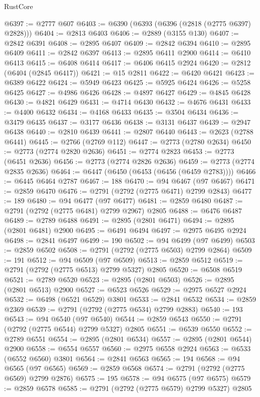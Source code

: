 \begin{lexlean}{RustCore}
\begin{coremodule}
@6397 := @2777 @607
@6403 := @6390 (@6393 (@6396 (@2818 (@2775 @6397) @2828)))
@6404 := @2813 @6403
@6406 := @2889 (@3155 @130)
@6407 := @2842 @6391
@6408 := @2895 @6407
@6409 := @2842 @6394
@6410 := @2895 @6409
@6411 := @2842 @6397
@6413 := @2895 @6411 @2900
@6414 := @6410 @6413
@6415 := @6408 @6414
@6417 := @6406 @6415 @2924
@6420 := @2812 (@6404 (@2845 @6417))
@6421 := @15 @2811
@6422 := @6420 @6421
@6423 := @6389 @6422
@6424 := @5949 @6423
@6425 := @5925 @6424
@6426 := @5258 @6425
@6427 := @4986 @6426
@6428 := @4897 @6427
@6429 := @4845 @6428
@6430 := @4821 @6429
@6431 := @4714 @6430
@6432 := @4676 @6431
@6433 := @4400 @6432
@6434 := @4168 @6433
@6435 := @3504 @6434
@6436 := @3479 @6435
@6437 := @3177 @6436
@6438 := @3131 @6437
@6439 := @2947 @6438
@6440 := @2810 @6439
@6441 := @2807 @6440
@6443 := @2623 (@2788 @6441)
@6445 := @2766 (@2769 @112)
@6447 := @2773 (@2780 @2634)
@6450 := @2773 (@2774 @2820 @2636)
@6451 := @2774 @2823
@6453 := @2773 (@6451 @2636)
@6456 := @2773 (@2774 @2826 @2636)
@6459 := @2773 (@2774 @2835 @2636)
@6464 := @6447 (@6450 (@6453 (@6456 (@6459 @2783))))
@6466 := @6445 @6464 @2787
@6467 := 188
@6470 := @94 @6467 (@97 @6467)
@6471 := @2859 @6470
@6476 := @2791 (@2792 (@2775 @6471) @2799 @2843)
@6477 := 189
@6480 := @94 @6477 (@97 @6477)
@6481 := @2859 @6480
@6487 := @2791 (@2792 (@2775 @6481) @2799 @2967) @2805
@6488 := @6476 @6487
@6489 := @2789 @6488
@6491 := @2895 (@2801 @6471)
@6494 := @2895 (@2801 @6481) @2900
@6495 := @6491 @6494
@6497 := @2975 @6495 @2924
@6498 := @2841 @6497
@6499 := 190
@6502 := @94 @6499 (@97 @6499)
@6503 := @2859 @6502
@6508 := @2791 (@2792 (@2775 @6503) @2799 @2864)
@6509 := 191
@6512 := @94 @6509 (@97 @6509)
@6513 := @2859 @6512
@6519 := @2791 (@2792 (@2775 @6513) @2799 @5327) @2805
@6520 := @6508 @6519
@6521 := @2789 @6520
@6523 := @2895 (@2801 @6503)
@6526 := @2895 (@2801 @6513) @2900
@6527 := @6523 @6526
@6529 := @2975 @6527 @2924
@6532 := @6498 (@6521 @6529) @3801
@6533 := @2841 @6532
@6534 := @2859 @2369
@6539 := @2791 (@2792 (@2775 @6534) @2799 @2883)
@6540 := 193
@6543 := @94 @6540 (@97 @6540)
@6544 := @2859 @6543
@6550 := @2791 (@2792 (@2775 @6544) @2799 @5327) @2805
@6551 := @6539 @6550
@6552 := @2789 @6551
@6554 := @2895 (@2801 @6534)
@6557 := @2895 (@2801 @6544) @2900
@6558 := @6554 @6557
@6560 := @2975 @6558 @2924
@6563 := @6533 (@6552 @6560) @3801
@6564 := @2841 @6563
@6565 := 194
@6568 := @94 @6565 (@97 @6565)
@6569 := @2859 @6568
@6574 := @2791 (@2792 (@2775 @6569) @2799 @2876)
@6575 := 195
@6578 := @94 @6575 (@97 @6575)
@6579 := @2859 @6578
@6585 := @2791 (@2792 (@2775 @6579) @2799 @5327) @2805

\end{coremodule}
\end{lexlean}
